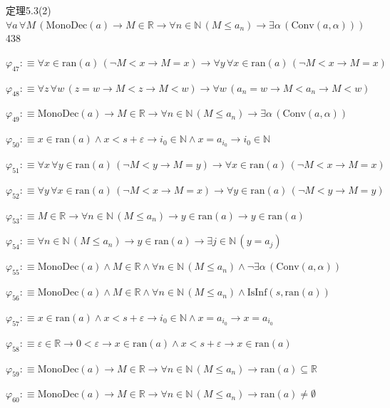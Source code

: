 \begin{fullproof}{定理5.3(2)}{$\forall a\,\forall M\,(\mathrm{MonoDec}(a) \to M \in \mathbb{R} \to \forall n \in \mathbb{N}\,(M \leq a_{n}) \to \exists \alpha\,(\mathrm{Conv}(a,\alpha)))$}{438}
\begin{abbrevlist}
\item $\varphi_{47} :\equiv \forall x \in \mathrm{ran}(a)\,(\neg M < x \to M = x) \to \forall y\,\forall x \in \mathrm{ran}(a)\,(\neg M < x \to M = x)$
\item $\varphi_{48} :\equiv \forall z\,\forall w\,(z = w \to M < z \to M < w) \to \forall w\,(a_{n} = w \to M < a_{n} \to M < w)$
\item $\varphi_{49} :\equiv \mathrm{MonoDec}(a) \to M \in \mathbb{R} \to \forall n \in \mathbb{N}\,(M \leq a_{n}) \to \exists \alpha\,(\mathrm{Conv}(a,\alpha))$
\item $\varphi_{50} :\equiv x \in \mathrm{ran}(a) \land x < s + \varepsilon \to i_{0} \in \mathbb{N} \land x = a_{i_{0}} \to i_{0} \in \mathbb{N}$
\item $\varphi_{51} :\equiv \forall x\,\forall y \in \mathrm{ran}(a)\,(\neg M < y \to M = y) \to \forall x \in \mathrm{ran}(a)\,(\neg M < x \to M = x)$
\item $\varphi_{52} :\equiv \forall y\,\forall x \in \mathrm{ran}(a)\,(\neg M < x \to M = x) \to \forall y \in \mathrm{ran}(a)\,(\neg M < y \to M = y)$
\item $\varphi_{53} :\equiv M \in \mathbb{R} \to \forall n \in \mathbb{N}\,(M \leq a_{n}) \to y \in \mathrm{ran}(a) \to y \in \mathrm{ran}(a)$
\item $\varphi_{54} :\equiv \forall n \in \mathbb{N}\,(M \leq a_{n}) \to y \in \mathrm{ran}(a) \to \exists j \in \mathbb{N}\,(y = a_{j})$
\item $\varphi_{55} :\equiv \mathrm{MonoDec}(a) \land M \in \mathbb{R} \land \forall n \in \mathbb{N}\,(M \leq a_{n}) \land \neg \exists \alpha\,(\mathrm{Conv}(a,\alpha))$
\item $\varphi_{56} :\equiv \mathrm{MonoDec}(a) \land M \in \mathbb{R} \land \forall n \in \mathbb{N}\,(M \leq a_{n}) \land \mathrm{IsInf}(s,\mathrm{ran}(a))$
\item $\varphi_{57} :\equiv x \in \mathrm{ran}(a) \land x < s + \varepsilon \to i_{0} \in \mathbb{N} \land x = a_{i_{0}} \to x = a_{i_{0}}$
\item $\varphi_{58} :\equiv \varepsilon \in \mathbb{R} \to 0 < \varepsilon \to x \in \mathrm{ran}(a) \land x < s + \varepsilon \to x \in \mathrm{ran}(a)$
\item $\varphi_{59} :\equiv \mathrm{MonoDec}(a) \to M \in \mathbb{R} \to \forall n \in \mathbb{N}\,(M \leq a_{n}) \to \mathrm{ran}(a) \subseteq \mathbb{R}$
\item $\varphi_{60} :\equiv \mathrm{MonoDec}(a) \to M \in \mathbb{R} \to \forall n \in \mathbb{N}\,(M \leq a_{n}) \to \mathrm{ran}(a) \neq \emptyset$

\end{abbrevlist}
\end{fullproof}
